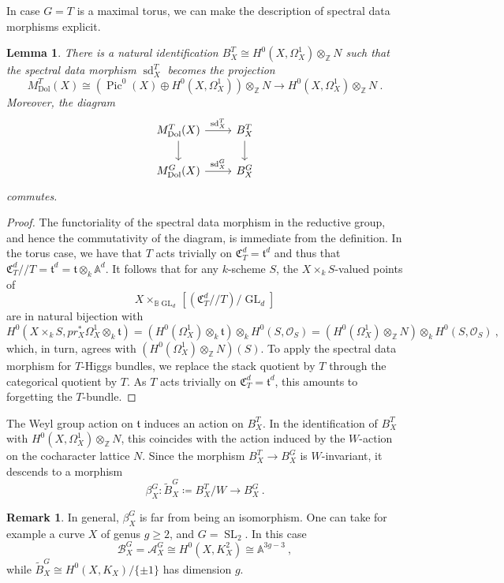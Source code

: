 \documentclass[11pt, a4paper]{amsart}
\newtheorem{lemma}[theorem]{Lemma}
\theoremstyle{definition}
\newtheorem{remark}[theorem]{Remark}
\theoremstyle{myitemstyle}
\newcommand{\Z}{\mathbb{Z}}
\newcommand{\A}{\mathbb{A}}
\newcommand{\mbb}[1]{\mathbb{#1}}
\newcommand{\mc}[1]{{\mathcal{#1}}}
\DeclareMathOperator{\Pic}{Pic}
\DeclareMathOperator{\GL}{GL}
\DeclareMathOperator{\SL}{SL}
\newcommand{\Dol}{{\mathrm{Dol}}}
\newcommand{\sd}{{\operatorname{sd}}}
\begin{document}
In case $G=T$ is a maximal torus, we can make the description of spectral data morphisms explicit.
\begin{lemma}
\label{lem:functoriality of spectral data}
There is a natural identification $B_X^T\cong H^0(X,\Omega^1_X)\otimes_\Z N$ such that the spectral data morphism $\sd^T_X$ becomes  the projection
\[
    M^T_\Dol(X)\cong (\Pic^0(X)\oplus H^0(X,\Omega^1_X))\otimes_\Z N\to H^0(X,\Omega^1_X)\otimes_\Z N\ .
\]
Moreover, the diagram
\[
\begin{tikzcd}
    M_\Dol^T(X) \arrow[r,"\sd_X^T"]\arrow[d]& 
        B^T_X  \arrow[d]\\
    M_\Dol^G(X) \arrow[r,"\sd_X^G"]&
        B^G_X
\end{tikzcd}
\]
commutes.
\end{lemma}
\begin{proof}
The functoriality of the spectral data morphism in the reductive group, and hence the commutativity of the diagram, is immediate from the definition. In the torus case, we have that $T$ acts trivially on $\mathfrak C^d_T=\mathfrak t^d$ and thus that $\mathfrak C^d_T/\!\!/T=\mathfrak t^d=\mathfrak t\otimes_k \A^d$. It follows that for any $k$-scheme $S$, the $X\times_k S$-valued points of  
\[
    X\times_{\mbb B\GL_d} [(\mathfrak C_T^d/\!\!/T)/\GL_d]
\]
are in natural bijection with 
\[
    H^0(X\times_k S,pr_X^*\Omega^1_X\otimes_k\mathfrak t) = (H^0(\Omega^1_X)\otimes_k \mathfrak t)\otimes_k H^0(S,\mc O_S) =(H^0(\Omega^1_X)\otimes_\Z N)\otimes_k H^0(S,\mc O_S)\ ,
\]
which, in turn,  agrees with $(H^0(\Omega^1_X)\otimes_\Z N)(S)$.  
To apply the spectral data morphism for $T$-Higgs bundles, we replace the stack quotient by $T$ through  the categorical quotient by $T$. As $T$ acts trivially on $\mathfrak{C}^d_T=\mathfrak t^d$, this amounts to forgetting the $T$-bundle.
\end{proof}

The Weyl group action on $\mathfrak t$ induces an action on $B^T_X$. In the identification of $B^T_X$ with $H^0(X,\Omega^1_X)\otimes_\mathbb{Z} N$, this coincides with  the action induced by the $W$-action on the cocharacter lattice $N$.  Since the morphism $B^T_X\rightarrow B_X^G$ is $W$-invariant, it  descends to a morphism
\[
    \beta^G_X\colon \widetilde B^G_X\coloneqq B^T_X/W \to B^G_X\ .
\]

\begin{remark} In general, $\beta^G_X$ is far from being an isomorphism. One can take for example  a curve $X$ of genus $g\geq 2$, and $G=\SL_2$. In this case 
\[
    \mathcal B^G_X=\mathcal{A}^G_X\cong H^0(X,K_X^2)\cong \mathbb{A}^{3g-3}\ ,
\]
while $\widetilde{B}^G_X\cong H^0(X,K_X)/\{\pm 1\}$ has dimension $g$.
\end{remark}
\end{document}

